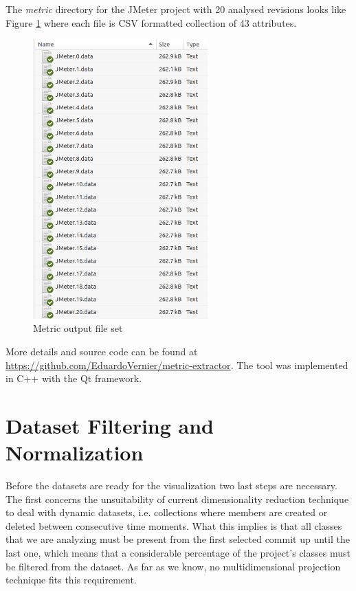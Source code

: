 The \textit{metric} directory for the JMeter project with 20 analysed revisions looks like Figure \ref{fig:jmeter_folder} where each file is CSV formatted collection of 43 attributes.

\begin{figure}[H]
	\centering
	\includegraphics[width=0.6\textwidth]{figures/metric_dir.png}
	\caption{Metric output file set}
	\label{fig:jmeter_folder}
\end{figure}

More details and source code can be found at \url{https://github.com/EduardoVernier/metric-extractor}. The tool was implemented in C++ with the Qt framework.

\section{Dataset Filtering and Normalization} \label{sec:filtering}
Before the datasets are ready for the visualization two last steps are necessary. The first concerns the unsuitability of current dimensionality reduction technique to deal with dynamic datasets, i.e. collections where members are created or deleted between consecutive time moments. What this implies is that all classes that we are analyzing must be present from the first selected commit up until the last one, which means that a considerable percentage of the project's classes must be filtered from the dataset. As far as we know, no multidimensional projection technique fits this requirement.

